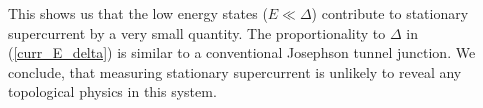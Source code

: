 This shows us that the low energy states ($ E\ll\Delta $) contribute to stationary supercurrent by a very small quantity. The proportionality to $ \Delta $ in (\ref{curr_E_delta}) is similar to  a conventional Josephson tunnel junction. We conclude, that measuring stationary supercurrent is unlikely to reveal any topological physics in this system.



